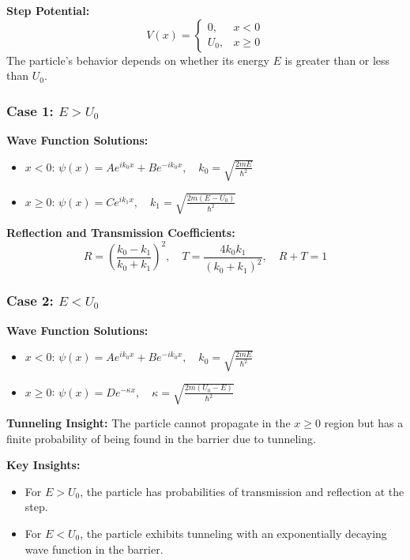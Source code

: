 \documentclass{article}
\newcommand{\conceptbox}[1]{\begin{tcolorbox}[colback=blue!10] #1 \end{tcolorbox}}
\begin{document}
\conceptbox{
\textbf{Step Potential:}
\[
V(x) = 
\begin{cases} 
0, & x < 0 \\ 
U_0, & x \geq 0 
\end{cases}
\]
The particle's behavior depends on whether its energy \( E \) is greater than or less than \( U_0 \).
}

\conceptbox{
\subsubsection*{Case 1: \( E > U_0 \)}

\textbf{Wave Function Solutions:}
\begin{itemize}
    \item \( x < 0 \): \( \psi(x) = Ae^{ik_0x} + Be^{-ik_0x}, \quad k_0 = \sqrt{\frac{2mE}{\hbar^2}} \)
    \item \( x \geq 0 \): \( \psi(x) = Ce^{ik_1x}, \quad k_1 = \sqrt{\frac{2m(E - U_0)}{\hbar^2}} \)
\end{itemize}

\textbf{Reflection and Transmission Coefficients:}
\[
R = \left( \frac{k_0 - k_1}{k_0 + k_1} \right)^2, \quad T = \frac{4k_0k_1}{(k_0 + k_1)^2}, \quad R + T = 1
\]
}


\conceptbox{
\subsubsection*{Case 2: \( E < U_0 \)}
\textbf{Wave Function Solutions:}
\begin{itemize}
    \item \( x < 0 \): \( \psi(x) = Ae^{ik_0x} + Be^{-ik_0x}, \quad k_0 = \sqrt{\frac{2mE}{\hbar^2}} \)
    \item \( x \geq 0 \): \( \psi(x) = De^{-\kappa x}, \quad \kappa = \sqrt{\frac{2m(U_0 - E)}{\hbar^2}} \)
\end{itemize}

\textbf{Tunneling Insight:}
The particle cannot propagate in the \( x \geq 0 \) region but has a finite probability of being found in the barrier due to tunneling.
}

\conceptbox{
\textbf{Key Insights:}
\begin{itemize}
    \item For \( E > U_0 \), the particle has probabilities of transmission and reflection at the step.
    \item For \( E < U_0 \), the particle exhibits tunneling with an exponentially decaying wave function in the barrier.
\end{itemize}
}
\end{document}

